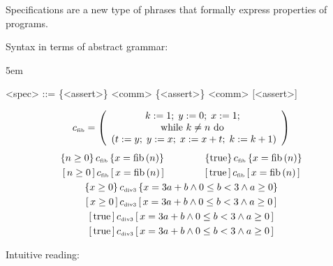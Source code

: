 \begin{enumcirc}
	\item
	Specifications are a new type of phrases that formally express properties of
	programs.
	\item
	Syntax in terms of abstract grammar:
	\begin{center}
		\begin{minipage}{0.5\textwidth}
			\grammarindent5em
			\begin{grammar}
				<spec> ::= \{<assert>\} <comm> \{<assert>\}
				\alt [<assert>] <comm> [<assert>]
			\end{grammar}
		\end{minipage}
	\end{center}
	\newpage
	\begin{exampletab}
		\[
			c_{\textrm{\tiny fib}} = \left( 
				\begin{array}{c}
					k := 1;\; y := 0;\; x:=1;\; \\
					\textrm{while } k \ne n \textrm{ do }            \\ \left( t := y;\; y := x;\; x := x + t;\; k := k + 1 \right)
				\end{array}
			 \right)
		\]
		\[
			\begin{array}{c}
				\left\{ n \ge 0 \right\}
				c_{\textrm{\tiny fib}}
				\left\{ x = \textrm{fib}\left( n \right) \right\}
				\qquad \qquad
				\left\{ \textrm{true} \right\}
				c_{\textrm{\tiny fib}}
				\left\{ x = \textrm{fib}\left( n \right) \right\}
				\\[0.3em]
				\left[ \, n \ge 0 \, \right]
				c_{\textrm{\tiny fib}}
				\left[ \, x = \textrm{fib}\left( n \right) \, \right]
				\qquad \qquad
				\left[ \, \textrm{true} \, \right]
				c_{\textrm{\tiny fib}}
				\left[ \, x = \textrm{fib}\left( n \right) \, \right]
				\\[0.3em]
				\left\{ x \ge 0 \right\}
				c_{\textrm{\tiny div3}}
				\left\{ x = 3a + b \wedge 0 \le b < 3 \wedge a \ge 0 \right\}
				\\[0.3em]
				\left[ \, x \ge 0 \, \right]
				c_{\textrm{\tiny div3}}
				\left[ \, x = 3a + b \wedge 0 \le b < 3 \wedge a \ge 0 \, \right]
				\\[0.3em]
				\left[ \, \textrm{true} \, \right]
				c_{\textrm{\tiny div3}}
				\left[ \, x = 3a + b \wedge 0 \le b < 3 \wedge a \ge 0 \, \right]
				\\[0.3em]
				\left[ \, \textrm{true} \, \right]
				c_{\textrm{\tiny div3}}
				\left[ \, x = 3a + b \wedge 0 \le b < 3 \wedge a \ge 0 \, \right]
			\end{array}
		\]
	\end{exampletab}
	\item
	Intuitive reading:
	\begin{enumrm}
		\item

\end{enumrm}
\end{enumcirc}
